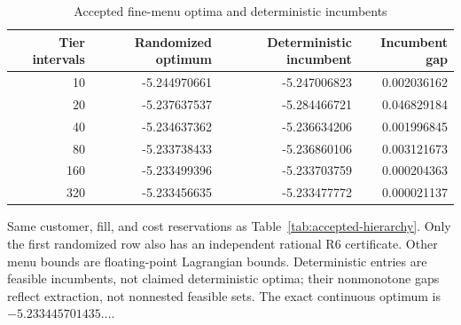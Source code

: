 \begin{table}[!ht]
\centering
\caption{Accepted fine-menu optima and deterministic incumbents}\label{tab:fine-menu}
\begin{tabular}{rrrr}\toprule
Tier intervals & Randomized optimum & Deterministic incumbent & Incumbent gap\\
\midrule
10 & -5.244970661 & -5.247006823 & 0.002036162\\
20 & -5.237637537 & -5.284466721 & 0.046829184\\
40 & -5.234637362 & -5.236634206 & 0.001996845\\
80 & -5.233738433 & -5.236860106 & 0.003121673\\
160 & -5.233499396 & -5.233703759 & 0.000204363\\
320 & -5.233456635 & -5.233477772 & 0.000021137\\
\bottomrule\end{tabular}
\par\smallskip\begin{minipage}{.98\textwidth}\small Same customer, fill, and cost reservations as Table~\ref{tab:accepted-hierarchy}. Only the first randomized row also has an independent rational R6 certificate. Other menu bounds are floating-point Lagrangian bounds. Deterministic entries are feasible incumbents, not claimed deterministic optima; their nonmonotone gaps reflect extraction, not nonnested feasible sets. The exact continuous optimum is $-5.233445701435\ldots$.\end{minipage}
\end{table}
